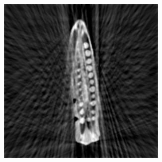 \documentclass{article}
\begin{document}
\begin{figure}[]
\begin{subfigure}[b]{0.24\linewidth}
        \caption{}
    \end{subfigure}
    \begin{subfigure}[b]{0.24\linewidth}
        \includegraphics[width=\textwidth]{../images/svm/okra/result_pilot.png}


\end{subfigure}
\end{figure}
\end{document}
